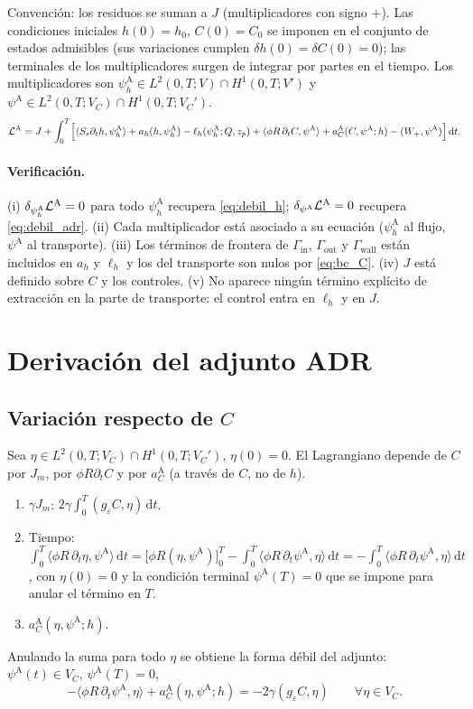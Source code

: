 \documentclass[11pt]{article}
\numberwithin{equation}{section}
\theoremstyle{remark}
\newcommand{\geps}{g_\varepsilon}
\newcommand{\pA}{\psi^{\mathrm{A}}}    %
\newcommand{\ph}[1]{\psi_h^{\mathrm{#1}}}  %
\newcommand{\dd}{\,\mathrm{d}}
\newcommand{\Gin}{\Gamma_{\mathrm{in}}}
\newcommand{\Gout}{\Gamma_{\mathrm{out}}}
\newcommand{\Gwall}{\Gamma_{\mathrm{wall}}}
\begin{document}
Convenci\'on: los residuos se suman a $J$ (multiplicadores con signo $+$). Las condiciones iniciales $h(0)=h_0$, $C(0)=C_0$ se imponen en el conjunto de estados admisibles
(sus variaciones cumplen $\delta h(0)=\delta C(0)=0$); las terminales de los multiplicadores surgen de integrar por partes en el tiempo.
Los multiplicadores son $\ph{A}\in L^2(0,T;V)\cap H^1(0,T;V')$ y $\pA\in L^2(0,T;V_C)\cap H^1(0,T;V_C')$.
\begin{multline}
\mathcal{L}^{\mathrm A}=J+\int_0^T\Bigl[\langle S_s\partial_th,\ph{A}\rangle+a_h(h,\ph{A})-\ell_h(\ph{A};Q,z_p)
+\langle\phi R\,\partial_tC,\pA\rangle+a_C^{\mathrm A}(C,\pA;h)-(W_+,\pA)\Bigr]\dd t .
\label{eq:L_ADR}
\end{multline}
\paragraph{Verificaci\'on.} (i) $\delta_{\ph{A}}\mathcal{L}^{\rm A}=0$ para todo $\ph{A}$ recupera \eqref{eq:debil_h}; $\delta_{\pA}\mathcal{L}^{\rm A}=0$ recupera \eqref{eq:debil_adr}.
(ii) Cada multiplicador est\'a asociado a su ecuaci\'on ($\ph{A}$ al flujo, $\pA$ al transporte). (iii) Los t\'erminos de frontera de $\Gin$, $\Gout$ y $\Gwall$ est\'an incluidos en $a_h$ y $\ell_h$
y los del transporte son nulos por \eqref{eq:bc_C}. (iv) $J$ est\'a definido sobre $C$ y los controles. (v) No aparece ning\'un t\'ermino expl\'icito de extracci\'on en la parte de transporte: el control entra en
$\ell_h$ y en $J$.

\section{Derivaci\'on del adjunto ADR}
\label{sec:adj_ADR}

\subsection{Variaci\'on respecto de $C$}
Sea $\eta\in L^2(0,T;V_C)\cap H^1(0,T;V_C')$, $\eta(0)=0$. El Lagrangiano depende de $C$ por $J_m$, por $\phi R\partial_tC$ y por $a_C^{\mathrm A}$ (a trav\'es de $C$, no de $h$).
\begin{enumerate}[label=(\alph*)]
\item $\gamma J_m$: $2\gamma\int_0^T(\geps C,\eta)\dd t$.
\item Tiempo: $\int_0^T\langle\phi R\,\partial_t\eta,\pA\rangle\dd t=\bigl[\phi R(\eta,\pA)\bigr]_0^T-\int_0^T\langle\phi R\,\partial_t\pA,\eta\rangle\dd t=-\int_0^T\langle\phi R\,\partial_t\pA,\eta\rangle\dd t$,
 con $\eta(0)=0$ y la condici\'on terminal $\pA(T)=0$ que se impone para anular el t\'ermino en $T$.
\item $a_C^{\mathrm A}(\eta,\pA;h)$.
\end{enumerate}
Anulando la suma para todo $\eta$ se obtiene la forma d\'ebil del adjunto: $\pA(t)\in V_C$, $\pA(T)=0$,
\begin{equation}
-\langle\phi R\,\partial_t\pA,\eta\rangle+a_C^{\mathrm A}(\eta,\pA;h)=-2\gamma(\geps C,\eta)\qquad\forall\eta\in V_C .
\label{eq:adj_debil_A}
\end{equation}
\end{document}
